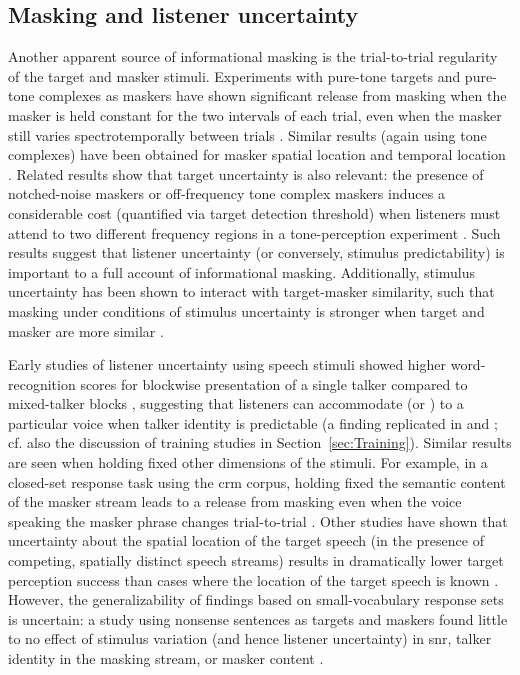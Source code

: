  
\subsection{Masking and listener uncertainty\label{sec:uncertainty}}
Another apparent source of informational masking is the trial-to-trial regularity of the target and masker stimuli.  Experiments with pure-tone targets and pure-tone complexes as maskers have shown significant release from masking when the masker is held constant for the two intervals of each trial, even when the masker still varies spectrotemporally between trials \citep{NeffGreen1987, NeffCallahan1988}.  Similar results (again using tone complexes) have been obtained for masker spatial location \citep{FanEtAl2008} and temporal location \citep{BoninoLeibold2008}.  Related results show that target uncertainty is also relevant: the presence of notched-noise maskers or off-frequency tone complex maskers induces a considerable cost (quantified via target detection threshold) when listeners must attend to two different frequency regions in a tone-perception experiment \citep{KiddEtAl2008}.  Such results suggest that listener uncertainty (or conversely, stimulus predictability) is important to a full account of informational masking.  Additionally, stimulus uncertainty has been shown to interact with target-masker similarity, such that masking under conditions of stimulus uncertainty is stronger when target and masker are more similar \citep{DurlachEtAl2003b}.

Early studies of listener uncertainty using speech stimuli showed higher word-recognition scores for blockwise presentation of a single talker compared to mixed-talker blocks \citep{SommersEtAl1994}, suggesting that listeners can accommodate (or ) to a particular voice when talker identity is predictable (a finding replicated in \citealt{BrungartSimpson2004} and \citealt{EricsonEtAl2004}; cf. also the discussion of training studies in Section~\ref{sec:Training}).  Similar results are seen when holding fixed other dimensions of the stimuli.  For example, in a closed-set response task using the \ac{crm} corpus, holding fixed the semantic content of the masker stream leads to a release from masking even when the voice speaking the masker phrase changes trial-to-trial \citep{BrungartSimpson2004}.  Other studies have shown that uncertainty about the spatial location of the target speech (in the presence of competing, spatially distinct speech streams) results in dramatically lower target perception success than cases where the location of the target speech is known \citep{EricsonEtAl2004, KiddEtAl2005a}.  However, the generalizability of findings based on small-vocabulary response sets is uncertain: a study using nonsense sentences as targets and maskers found little to no effect of stimulus variation (and hence listener uncertainty) in \ac{snr}, talker identity in the masking stream, or masker content \citep{FreymanEtAl2007}.

